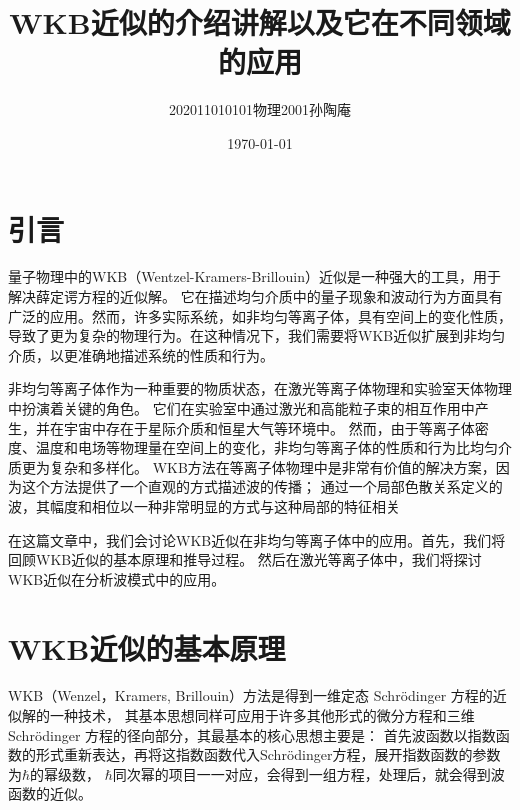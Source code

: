 \documentclass[12pt, a4paper, oneside]{ctexart}
\title{WKB近似的介绍讲解以及它在不同领域的应用}
\date{\today}
\author{202011010101物理2001孙陶庵}
\begin{document}
\begin{spacing}{2.0}
\tableofcontents
\maketitle

\section{引言}
量子物理中的WKB（Wentzel-Kramers-Brillouin）近似是一种强大的工具，用于解决薛定谔方程的近似解。
它在描述均匀介质中的量子现象和波动行为方面具有广泛的应用。然而，许多实际系统，如非均匀等离子体，具有空间上的变化性质，
导致了更为复杂的物理行为。在这种情况下，我们需要将WKB近似扩展到非均匀介质，以更准确地描述系统的性质和行为。

非均匀等离子体作为一种重要的物质状态，在激光等离子体物理和实验室天体物理中扮演着关键的角色。
它们在实验室中通过激光和高能粒子束的相互作用中产生，并在宇宙中存在于星际介质和恒星大气等环境中。
然而，由于等离子体密度、温度和电场等物理量在空间上的变化，非均匀等离子体的性质和行为比均匀介质更为复杂和多样化。
WKB方法在等离子体物理中是非常有价值的解决方案，因为这个方法提供了一个直观的方式描述波的传播；
通过一个局部色散关系定义的波，其幅度和相位以一种非常明显的方式与这种局部的特征相关

在这篇文章中，我们会讨论WKB近似在非均匀等离子体中的应用。首先，我们将回顾WKB近似的基本原理和推导过程。
然后在激光等离子体中，我们将探讨WKB近似在分析波模式中的应用。

\section{WKB近似的基本原理}
WKB（Wenzel，Kramers, Brillouin）方法是得到一维定态 Schrödinger 方程的近似解的一种技术，
其基本思想同样可应用于许多其他形式的微分方程和三维 Schrödinger 方程的径向部分，其最基本的核心思想主要是：
首先波函数以指数函数的形式重新表达，再将这指数函数代入Schrödinger方程，展开指数函数的参数为$\hbar$的幂级数，
$\hbar$同次幂的项目一一对应，会得到一组方程，处理后，就会得到波函数的近似。

\end{spacing}
\end{document}
